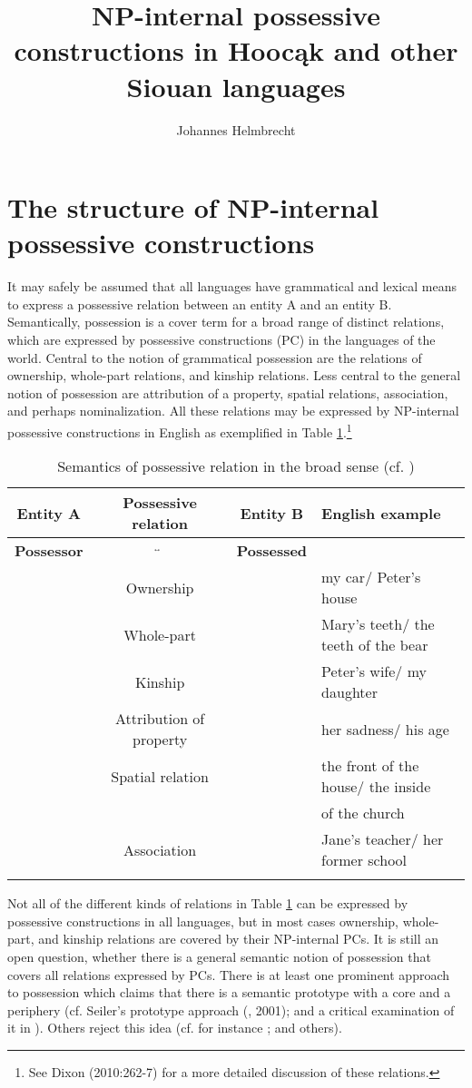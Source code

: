 \documentclass[output=paper]{LSP/langsci}
\author{Johannes Helmbrecht}
\title{NP-internal possessive constructions in Hoocąk and other Siouan languages}
\begin{document}
\section{The structure of NP-internal possessive constructions}
It may safely be assumed that all languages have grammatical and lexical means to express a possessive relation between an entity A and an entity B. Semantically, possession is a cover term for a broad range of distinct relations, which are expressed by possessive constructions (PC) in the languages of the world. Central to the notion of grammatical possession are the relations of ownership, whole-part relations, and kinship relations. Less central to the general notion of possession are attribution of a property, spatial relations, association, and perhaps nominalization. All these relations may be expressed by NP-internal possessive constructions in English as exemplified in Table \ref{semantics}.\footnote{See Dixon (2010:262-7) for a more detailed discussion of these relations.}

\begin{table}
\caption{Semantics of possessive relation in the broad sense (cf. \citealt[262-7]{Dixon2010})} \label{semantics}
\small
\begin{tabular}{ c c c l }
\lsptoprule
\textbf{Entity A}  & \textbf{Possessive relation}	 & \textbf{Entity B} & \textbf{English example} \\
\midrule 
\textbf{Possessor} & $\overleftrightarrow{\hspace{3cm}}$  & \textbf{Possessed} & \\
& Ownership	&  & my car/ Peter's house \\
& Whole-part	 & & Mary's teeth/ the teeth of the bear \\
& Kinship	 & & Peter's wife/ my daughter \\
& Attribution of property & & her sadness/ his age \\
& Spatial relation & & the front of the house/ the inside   \\
& & & of the church \\
& Association & & Jane's teacher/ her former school \\
\lspbottomrule
\end{tabular}
\end{table}

Not all of the different kinds of relations in Table \ref{semantics} can be expressed by possessive constructions in all languages, but in most cases ownership, whole-part, and kinship relations are covered by their NP-internal PCs. It is still an open question, whether there is a general semantic notion of possession that covers all relations expressed by PCs. There is at least one prominent approach to possession which claims that there is a semantic prototype with a core and a periphery (cf. Seiler's prototype approach (\citealt{Seiler1983}, 2001); and a critical examination of it in \citealt{Helmbrecht2003}). Others reject this idea (cf. for instance \citealt{Heine1997}; \citealt[263]{Dixon2010} and others).
\end{document}
